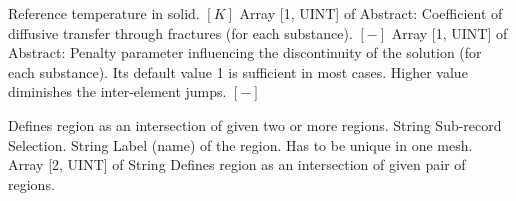 \begin{RecordType}
			{\textrangle}
			{} %
			{{{Reference temperature in solid. }{$[K]$}}}
		\KeyItem
			{}
			{{Array [1, UINT] of }{Abstract}{: }}
			{\textrangle}
			{} %
			{{{Coefficient of diffusive transfer through fractures (for each substance). }{$[-]$}}}
		\KeyItem
			{}
			{{Array [1, UINT] of }{Abstract}{: }}
			{\textrangle}
			{} %
			{{{Penalty parameter influencing the discontinuity of the solution (for each substance). Its default value 1 is sufficient in most cases. Higher value diminishes the inter-element jumps. }{$[-]$}}}
\end{RecordType}
\begin{RecordType}
	{}
	{} %
	{} %
	{} %
	{{{Defines region as an intersection of given two or more regions.}}}
		\KeyItem
			{}
			{{String}}
			{\textrangle}
			{} %
			{{{Sub-record Selection.}}}
		\KeyItem
			{}
			{{String}}
			{\textrangle}
			{} %
			{{{Label (name) of the region. Has to be unique in one mesh.}}}
		\KeyItem
			{}
			{{Array [2, UINT] of }{String}}
			{\textrangle}
			{} %
			{{{Defines region as an intersection of given pair of regions.}}}
\end{RecordType}
